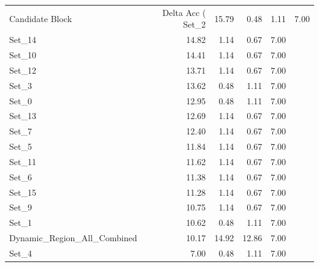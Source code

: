 \begin{tabular}{lrrrr}
\toprule
Candidate Block & Delta Acc (%
\midrule
Set_2 & 15.79 & 0.48 & 1.11 & 7.00 \\
Set_14 & 14.82 & 1.14 & 0.67 & 7.00 \\
Set_10 & 14.41 & 1.14 & 0.67 & 7.00 \\
Set_12 & 13.71 & 1.14 & 0.67 & 7.00 \\
Set_3 & 13.62 & 0.48 & 1.11 & 7.00 \\
Set_0 & 12.95 & 0.48 & 1.11 & 7.00 \\
Set_13 & 12.69 & 1.14 & 0.67 & 7.00 \\
Set_7 & 12.40 & 1.14 & 0.67 & 7.00 \\
Set_5 & 11.84 & 1.14 & 0.67 & 7.00 \\
Set_11 & 11.62 & 1.14 & 0.67 & 7.00 \\
Set_6 & 11.38 & 1.14 & 0.67 & 7.00 \\
Set_15 & 11.28 & 1.14 & 0.67 & 7.00 \\
Set_9 & 10.75 & 1.14 & 0.67 & 7.00 \\
Set_1 & 10.62 & 0.48 & 1.11 & 7.00 \\
Dynamic_Region_All_Combined & 10.17 & 14.92 & 12.86 & 7.00 \\
Set_4 & 7.00 & 0.48 & 1.11 & 7.00 \\
\bottomrule
\end{tabular}
